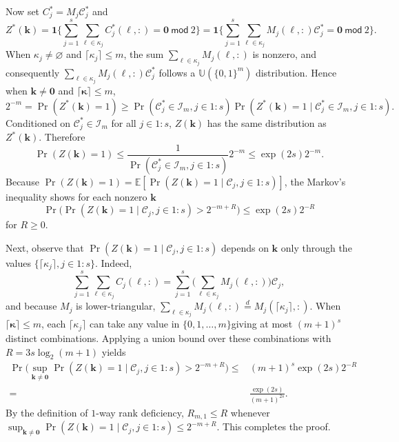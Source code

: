 \documentclass{article}
\theoremstyle{definition}
\renewcommand{\le}{\leqslant}
\renewcommand{\leq}{\leqslant}
\renewcommand{\geq}{\geqslant}
\renewcommand{\emptyset}{\varnothing}
\newcommand{\tmod}{\ \mathsf{mod}\ }
\newcommand{\bsk}{\boldsymbol{k}}
\newcommand{\bszero}{\boldsymbol{0}}
\newcommand{\bsone}{\boldsymbol{1}}
\newcommand{\bskappa}{\boldsymbol{\kappa}}
\newcommand{\dunif}{\mathbb{U}}
\newcommand{\e}{\mathbb{E}}
\begin{document}
Now set  $C^*_j=M_j \mathcal{C}^*_j$ and 
\begin{equation}\label{eqn:Zkstar}
    Z^*(\bsk)=\bsone\Big\{ \sum_{j=1}^s \sum_{\ell\in \kappa_j}  C^*_j(\ell,:)=\bszero \tmod 2\Big\}=\bsone\Big\{\sum_{j=1}^s \sum_{\ell\in \kappa_j} M_j(\ell,:) \mathcal{C}^*_j=\bszero \tmod 2\Big\}.
\end{equation}
When $\kappa_j\neq\emptyset$ and $\lceil\kappa_j\rceil\leq m$, the sum $\sum_{\ell\in \kappa_j} M_j(\ell,:)$ is nonzero, and consequently $ \sum_{\ell\in \kappa_j} M_j(\ell,:) \mathcal{C}^*_j$ follows a $\dunif(\{0,1\}^m)$ distribution. Hence when $\bsk\neq \bszero$ and $\lceil\bskappa\rceil\leq m$,
$$2^{-m}=\Pr(Z^*(\bsk)=1)\geq \Pr(\mathcal{C}^*_j\in \mathcal{I}_m,j\in 1{:}s)\Pr(Z^*(\bsk)=1\mid \mathcal{C}^*_j\in \mathcal{I}_m,j\in 1{:}s).$$
Conditioned on $\mathcal{C}^*_j\in \mathcal{I}_m$ for all $j\in 1{:}s$, $Z(\bsk)$ has the same distribution as $Z^*(\bsk)$. Therefore
\begin{equation}\label{eqn:Zkbound}
    \Pr(Z(\bsk)=1)\leq \frac{1}{\Pr(\mathcal{C}^*_j\in \mathcal{I}_m,j\in 1{:}s)} 2^{-m} \leq \exp(2s)2^{-m}.
\end{equation}
Because $\Pr(Z(\bsk)=1)=\e[\Pr(Z(\bsk)=1\mid \mathcal{C}_j, j\in 1{:}s )]$,  the Markov's inequality shows for each nonzero $\bsk$
\begin{equation}\label{eqn:largeZkbound}
    \Pr\Big(\Pr(Z(\bsk)=1\mid \mathcal{C}_j, j\in 1{:}s)> 2^{-m+R}\Big)\leq \exp(2s)2^{-R}
\end{equation}
for $R\geq 0$. 

Next, observe that $\Pr(Z(\bsk)=1\mid \mathcal{C}_j, j\in 1{:}s)$ depends on $\bsk$ only through the values $\{\lceil\kappa_j\rceil, j\in 1{:}s\}$. Indeed,
$$\sum_{j=1}^s \sum_{\ell\in \kappa_j}  C_j(\ell,:)=\sum_{j=1}^s \Big(\sum_{\ell\in\kappa_j}M_j(\ell,:)\Big) \mathcal{C}_j,$$
and because $M_j$ is lower-triangular,  $\sum_{\ell\in\kappa_j}M_j(\ell,:)\overset{d}{=}M_j(\lceil\kappa_j\rceil,:)$. When $\lceil\bskappa\rceil\leq m$, each $\lceil\kappa_j\rceil$ can take any value in $\{0,1,\dots,m\}$giving at most $(m+1)^s$ distinct combinations. Applying a union bound over these combinations with $R=3s\log_2(m+1)$ yields
\begin{align*}
 \Pr\Big(\sup_{\bsk\neq\bszero}\Pr(Z(\bsk)=1\mid \mathcal{C}_j, j\in 1{:}s)> 2^{-m+R}\Big)\leq & (m+1)^s \exp(2s)2^{-R}\\
 =& \frac{\exp(2s)}{(m+1)^{2s}}.   
\end{align*}
By the definition of $1$-way rank deficiency, $R_{m,1}\leq R$ whenever $\sup_{\bsk\neq\bszero}\Pr(Z(\bsk)=1\mid \mathcal{C}_j, j\in 1{:}s)\le 2^{-m+R}$. This completes the proof.
\end{document}
